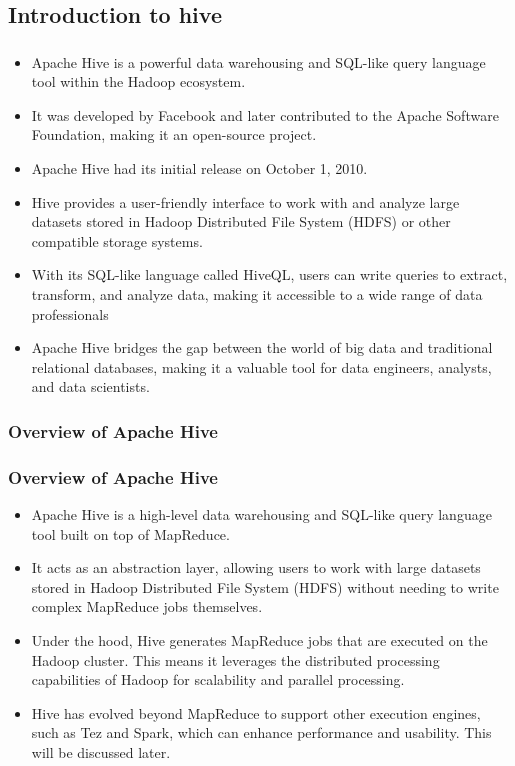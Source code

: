 \subsection{Introduction to hive}
\begin{frame}
\frametitle{\subsecname}
\begin{itemize} 
	\item Apache Hive is a powerful data warehousing and SQL-like query language tool within the Hadoop ecosystem.
	\item It was developed by Facebook and later contributed to the Apache Software Foundation, making it an open-source project.
	\item Apache Hive had its initial release on October 1, 2010.
	\item Hive provides a user-friendly interface to work with and analyze large datasets stored in Hadoop Distributed File System (HDFS) or other compatible storage systems.
	\item With its SQL-like language called HiveQL, users can write queries to extract, transform, and analyze data, making it accessible to a wide range of data professionals
	\item Apache Hive bridges the gap between the world of big data and traditional relational databases, making it a valuable tool for data engineers, analysts, and data scientists.

\end{itemize}
\end{frame}



\subsubsection{Overview of Apache Hive}
\begin{frame}
\frametitle{Overview of Apache Hive}
\begin{itemize} 
	\item Apache Hive is a high-level data warehousing and SQL-like query language tool built on top of MapReduce.
	\item It acts as an abstraction layer, allowing users to work with large datasets stored in Hadoop Distributed File System (HDFS) without needing to write complex MapReduce jobs themselves.
	\item Under the hood, Hive generates MapReduce jobs that are executed on the Hadoop cluster. This means it leverages the distributed processing capabilities of Hadoop for scalability and parallel processing.
	\item Hive has evolved beyond MapReduce to support other execution engines, such as Tez and Spark, which can enhance performance and usability. This will be discussed later.

\end{itemize}
\end{frame}

